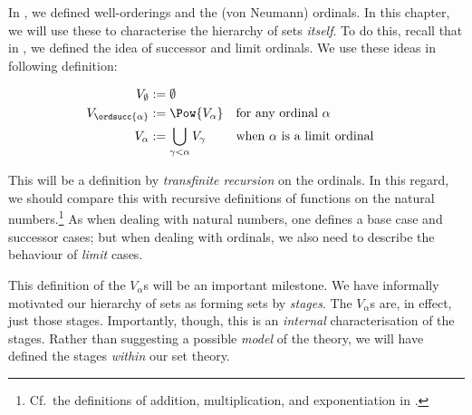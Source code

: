 \documentclass[../../../include/open-logic-section]{subfiles}
\begin{document}


In , we defined well-orderings and the
(von Neumann) ordinals. In this chapter, we will use these to
characterise the hierarchy of sets \emph{itself}. To do this, recall
that in , we defined the idea of
successor and limit ordinals. We use these ideas in following
definition:

\begin{defn}
	\begin{align*}
	V_\emptyset &:= \emptyset\\
	V_{\ordsucc{\alpha}} &:= \Pow{V_\alpha} & & 
	\text{for any ordinal }\alpha\\
	V_{\alpha} &:= \bigcup_{\gamma < \alpha} V_\gamma & & 
	\text{when }\alpha\text{ is a limit ordinal}
\end{align*}
\end{defn}

This will be a definition by \emph{transfinite recursion} on the
ordinals. In this regard, we should compare this with recursive
definitions of functions on the natural numbers.\footnote{Cf.\ the
definitions of addition, multiplication, and exponentiation in
.} As when dealing with natural
numbers, one defines a base case and successor cases; but when dealing
with ordinals, we also need to describe the behaviour of \emph{limit}
cases. 

This definition of the $V_\alpha$s will be an important milestone. We
have informally motivated our hierarchy of sets as forming sets by
\emph{stages}. The $V_\alpha$s are, in effect, just those stages.
Importantly, though, this is an \emph{internal} characterisation of
the stages. Rather than suggesting a possible \emph{model} of the
theory, we will have defined the stages \emph{within} our set theory.
\end{document}
